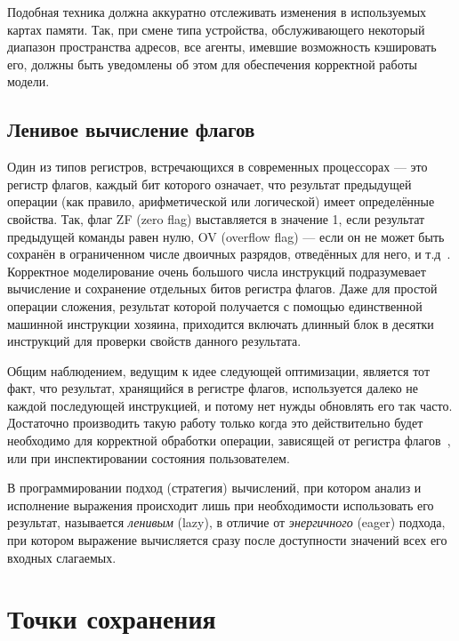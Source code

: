 Подобная техника должна аккуратно отслеживать изменения в используемых картах памяти. Так, при смене типа устройства, обслуживающего некоторый диапазон пространства адресов, все агенты, имевшие возможность кэшировать его, должны быть уведомлены об этом для обеспечения корректной работы модели.

\subsection{Ленивое вычисление флагов}

Один из типов регистров, встречающихся в современных процессорах — это регистр флагов, каждый бит которого означает, что результат предыдущей операции (как правило, арифметической или логической) имеет определённые свойства. Так, флаг ZF (\abbr zero flag) выставляется в значение 1, если результат предыдущей команды равен нулю, OV (\abbr overflow flag) — если он не может быть сохранён в ограниченном числе двоичных разрядов, отведённых для него, и т.д~\cite{intelmanual1}. Корректное моделирование очень большого числа инструкций подразумевает вычисление и сохранение отдельных битов регистра флагов. Даже для простой операции сложения, результат которой получается с помощью единственной машинной инструкции хозяина, приходится включать длинный блок в десятки инструкций для проверки свойств данного результата.

Общим наблюдением, ведущим к идее следующей оптимизации, является тот факт, что результат, хранящийся в регистре флагов, используется далеко не каждой последующей инструкцией, и потому нет нужды обновлять его так часто. Достаточно производить такую работу только когда это действительно будет необходимо для корректной обработки операции, зависящей от регистра флагов~\cite{bochs}, или при инспектировании состояния пользователем. 

\begin{digression}
В программировании подход (стратегия) вычислений, при котором анализ и исполнение выражения происходит лишь при необходимости использовать его результат, называется \textit{ленивым} (\abbr lazy), в отличие от \textit{энергичного} (\abbr eager) подхода, при котором выражение вычисляется сразу после доступности значений всех его входных слагаемых. %
\end{digression}

\section{Точки сохранения}


